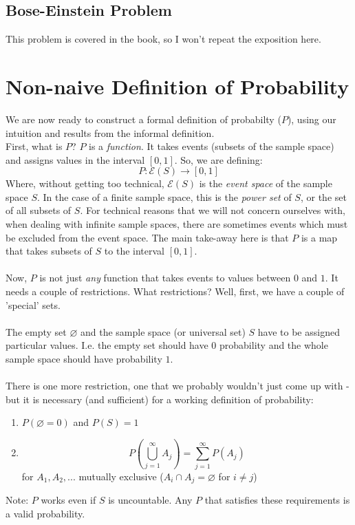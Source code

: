 \documentclass[12pt]{article} %
\begin{document}
\subsection{Bose-Einstein Problem}
This problem is covered in the book, so I won't repeat the exposition here.
\section{Non-naive Definition of Probability}
We are now ready to construct a formal definition of probabilty ($P$), using our intuition and results from the informal definition.\\
First, what is $P$? $P$ is a \emph{function}. It takes events (subsets of the sample space) and assigns values in the interval $\left[0,1\right]$. So, we are defining:
$$P:\mathcal{E}(S)\rightarrow \left[0,1\right]$$
Where, without getting too technical, $\mathcal{E}(S)$ is the \emph{event space} of the sample space $S$. In the case of a finite sample space, this is the \emph{power set} of $S$, or the set of all subsets of $S$. For technical reasons that we will not concern ourselves with, when dealing with infinite sample spaces, there are sometimes events which must be excluded from the event space. The main take-away here is that $P$ is a map that takes subsets of $S$ to the interval $[0,1]$.\\\\
Now, $P$ is not just \emph{any} function that takes events to values between $0$ and $1$. It needs a couple of restrictions. What restrictions?  Well, first, we have a couple of 'special' sets. \\\\
The empty set $\varnothing$ and the sample space (or universal set) $S$ have to be assigned particular values. I.e. the empty set should have $0$ probability and the whole sample space should have probability $1$.\\\\
There is one more restriction, one that we probably wouldn't just come up with - but it is necessary (and sufficient) for a working definition of probability:

\begin{enumerate}
\item $P(\varnothing = 0)$ and $P(S)=1$
\item $$P\left(\bigcup_{j=1}^\infty A_j\right) = \sum_{j=1}^\infty P\left(A_j\right)$$
for $A_1,A_2,...$ mutually exclusive ($A_i\cap A_j = \varnothing$ for $i\neq j$)
\end{enumerate}
Note: $P$ works even if $S$ is uncountable. Any $P$ that satisfies these requirements is a valid probability.
\end{document}
